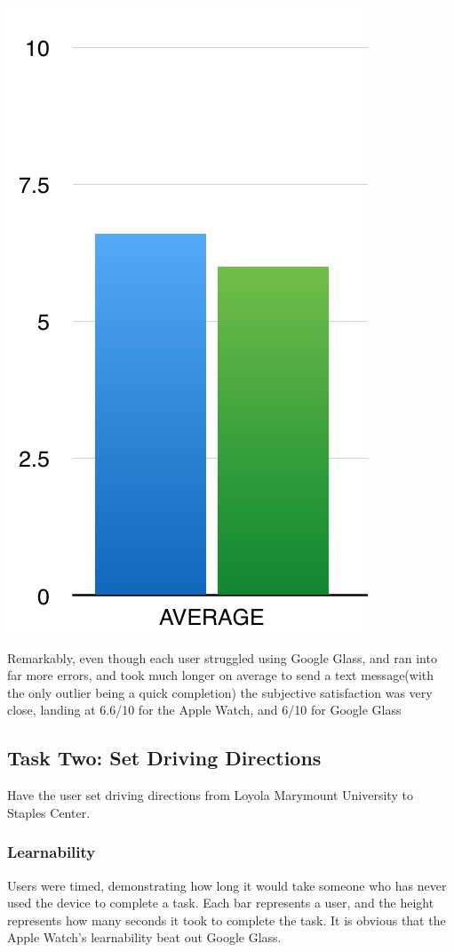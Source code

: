 \documentclass[paper=a4, fontsize=11pt]{scrartcl}	%
\numberwithin{equation}{section}															%
\numberwithin{figure}{section}																%
\numberwithin{table}{section}																%
\begin{document}
\includegraphics[scale=0.8]{task1satav}



Remarkably, even though each user struggled using Google Glass, and ran into far more errors, and took much longer on average to send a text message(with the only outlier being a quick completion) the subjective satisfaction was very close, landing at 6.6/10 for the Apple Watch, and 6/10 for Google Glass

\subsection{Task Two: Set Driving Directions}
Have the user set driving directions from Loyola Marymount University to Staples Center.

\subsubsection{Learnability}
Users were timed, demonstrating how long it would take someone who has never used the device to complete a task. Each bar represents a user, and the height represents how many seconds it took to complete the task. It is obvious that the Apple Watch's learnability beat out Google Glass.
\end{document}
